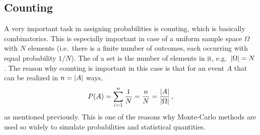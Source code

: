 \begin{table}[t]
\centering



\caption{Visual representation of the sample space of two consecutive coin flips (where a fair coin is assumed, every outcome has the same probability $\frac{1}{4}$. As the axes labels indicate, the $x$-axis is used for results of the first flip and the $y$-axis for results of the second flip.}

\label{tab:ss_double_coinflip}
\end{table}



	\subsection{Counting}
A very important task in assigning probabilities is counting, which is basically combinatorics. This is especially important in case of a uniform sample space $\Omega$ with $N$ elements (i.e.~there is a finite number of outcomes, each occurring with equal probability $1 / N$). The  of a set is the number of elements in it, e.g.~$\abs{\Omega} = N$. The reason why counting is important in this case is that for an event $A$ that can be realized in $n = \abs{A}$ ways,
\begin{equation}
P(A) = \sum_{i = 1}^n \frac{1}{N} = \frac{n}{N} = \frac{\abs{A}}{\abs{\Omega}} \, ,
\end{equation}
as mentioned previously. This is one of the reasons why Monte-Carlo methods are used so widely to simulate probabilities and statistical quantities.


